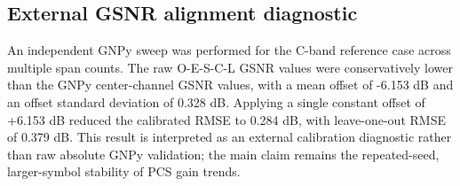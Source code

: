 \subsection{External GSNR alignment diagnostic}
An independent GNPy sweep was performed for the C-band reference case across multiple span counts. The raw O-E-S-C-L GSNR values were conservatively lower than the GNPy center-channel GSNR values, with a mean offset of -6.153 dB and an offset standard deviation of 0.328 dB. Applying a single constant offset of +6.153 dB reduced the calibrated RMSE to 0.284 dB, with leave-one-out RMSE of 0.379 dB. This result is interpreted as an external calibration diagnostic rather than raw absolute GNPy validation; the main claim remains the repeated-seed, larger-symbol stability of PCS gain trends.
